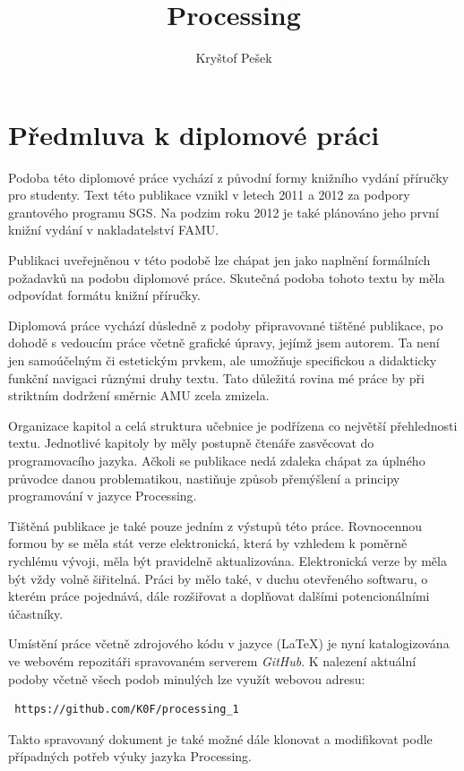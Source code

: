 \documentclass[10pt]{book}
\title{Processing}
\author{Kryštof Pešek}
\date{} %
\newcommand{\oddil}[1]{\section{#1}\index{#1}\label{#1}}
\begin{document}

\makeglossaries











\setmainfont{Verdana}
\setsansfont{Verdana}

\oddil{Předmluva k diplomové práci}


Podoba této diplomové práce vychází z původní formy knižního vydání příručky pro studenty. Text této publikace vznikl v letech 2011 a 2012 za podpory grantového programu SGS. Na podzim roku 2012 je také plánováno jeho první knižní vydání v nakladatelství FAMU.

Publikaci uveřejněnou v této podobě lze chápat jen jako naplnění formálních požadavků na podobu diplomové práce. Skutečná podoba tohoto textu by měla odpovídat formátu knižní příručky.

Diplomová práce vychází důsledně z podoby připravované tištěné publikace, po dohodě s vedoucím práce včetně grafické úpravy, jejímž jsem autorem. Ta není jen samoúčelným či estetickým prvkem, ale umožňuje
specifickou a didakticky funkční navigaci různými druhy textu. Tato důležitá rovina mé práce by při striktním dodržení směrnic AMU zcela zmizela. 


Organizace kapitol a celá struktura učebnice je podřízena co největší přehlednosti textu. Jednotlivé kapitoly by měly postupně čtenáře zasvěcovat do programovacího jazyka. Ačkoli se publikace nedá zdaleka chápat za úplného průvodce danou problematikou, nastiňuje způsob přemýšlení a principy programování v jazyce Processing.

Tištěná publikace je také pouze jedním z výstupů této práce. Rovnocennou formou by se měla stát verze elektronická, která by vzhledem k poměrně rychlému vývoji, měla být pravidelně aktualizována. Elektronická verze by měla být vždy volně šiřitelná. Práci by mělo také, v duchu otevřeného softwaru, o kterém práce pojednává, dále rozšiřovat a doplňovat dalšími potencionálními účastníky.

Umístění práce včetně zdrojového kódu v jazyce (\LaTeX)  je nyní katalogizována ve webovém repozitáři spravovaném serverem {\em GitHub}. K nalezení aktuální podoby včetně všech podob minulých lze využít webovou adresu: \begin{verbatim}
 https://github.com/K0F/processing_1
\end{verbatim}
Takto spravovaný dokument je také možné dále klonovat a modifikovat podle případných potřeb výuky jazyka Processing.
\end{document}
